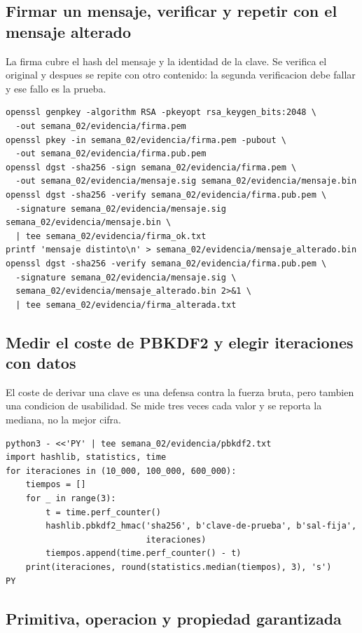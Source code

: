 \documentclass[11pt,a4paper]{article}
\begin{document}
\subsection{Firmar un mensaje, verificar y repetir con el mensaje alterado}

La firma cubre el hash del mensaje y la identidad de la clave. Se verifica el original y despues se repite con otro contenido: la segunda verificacion debe fallar y ese fallo es la prueba.

\begin{lstlisting}[style=estiloCodigo]
openssl genpkey -algorithm RSA -pkeyopt rsa_keygen_bits:2048 \
  -out semana_02/evidencia/firma.pem
openssl pkey -in semana_02/evidencia/firma.pem -pubout \
  -out semana_02/evidencia/firma.pub.pem
openssl dgst -sha256 -sign semana_02/evidencia/firma.pem \
  -out semana_02/evidencia/mensaje.sig semana_02/evidencia/mensaje.bin
openssl dgst -sha256 -verify semana_02/evidencia/firma.pub.pem \
  -signature semana_02/evidencia/mensaje.sig semana_02/evidencia/mensaje.bin \
  | tee semana_02/evidencia/firma_ok.txt
printf 'mensaje distinto\n' > semana_02/evidencia/mensaje_alterado.bin
openssl dgst -sha256 -verify semana_02/evidencia/firma.pub.pem \
  -signature semana_02/evidencia/mensaje.sig \
  semana_02/evidencia/mensaje_alterado.bin 2>&1 \
  | tee semana_02/evidencia/firma_alterada.txt
\end{lstlisting}

\subsection{Medir el coste de PBKDF2 y elegir iteraciones con datos}

El coste de derivar una clave es una defensa contra la fuerza bruta, pero tambien una condicion de usabilidad. Se mide tres veces cada valor y se reporta la mediana, no la mejor cifra.

\begin{lstlisting}[style=estiloCodigo]
python3 - <<'PY' | tee semana_02/evidencia/pbkdf2.txt
import hashlib, statistics, time
for iteraciones in (10_000, 100_000, 600_000):
    tiempos = []
    for _ in range(3):
        t = time.perf_counter()
        hashlib.pbkdf2_hmac('sha256', b'clave-de-prueba', b'sal-fija',
                            iteraciones)
        tiempos.append(time.perf_counter() - t)
    print(iteraciones, round(statistics.median(tiempos), 3), 's')
PY
\end{lstlisting}

\needspace{8\baselineskip}\subsection{Primitiva, operacion y propiedad garantizada}
\end{document}
